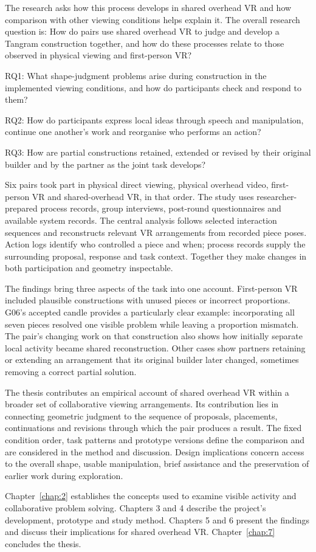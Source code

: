 The research asks how this process develops in shared overhead VR and how comparison with other viewing conditions helps explain it. The overall research question is: How do pairs use shared overhead VR to judge and develop a Tangram construction together, and how do these processes relate to those observed in physical viewing and first-person VR?

RQ1: What shape-judgment problems arise during construction in the implemented viewing conditions, and how do participants check and respond to them?

RQ2: How do participants express local ideas through speech and manipulation, continue one another's work and reorganise who performs an action?

RQ3: How are partial constructions retained, extended or revised by their original builder and by the partner as the joint task develops?

Six pairs took part in physical direct viewing, physical overhead video, first-person VR and shared-overhead VR, in that order. The study uses researcher-prepared process records, group interviews, post-round questionnaires and available system records. The central analysis follows selected interaction sequences and reconstructs relevant VR arrangements from recorded piece poses. Action logs identify who controlled a piece and when; process records supply the surrounding proposal, response and task context. Together they make changes in both participation and geometry inspectable.

The findings bring three aspects of the task into one account. First-person VR included plausible constructions with unused pieces or incorrect proportions. G06's accepted candle provides a particularly clear example: incorporating all seven pieces resolved one visible problem while leaving a proportion mismatch. The pair's changing work on that construction also shows how initially separate local activity became shared reconstruction. Other cases show partners retaining or extending an arrangement that its original builder later changed, sometimes removing a correct partial solution.

The thesis contributes an empirical account of shared overhead VR within a broader set of collaborative viewing arrangements. Its contribution lies in connecting geometric judgment to the sequence of proposals, placements, continuations and revisions through which the pair produces a result. The fixed condition order, task patterns and prototype versions define the comparison and are considered in the method and discussion. Design implications concern access to the overall shape, usable manipulation, brief assistance and the preservation of earlier work during exploration.

Chapter~\ref{chap:2} establishes the concepts used to examine visible activity and collaborative problem solving. Chapters 3 and 4 describe the project's development, prototype and study method. Chapters 5 and 6 present the findings and discuss their implications for shared overhead VR. Chapter~\ref{chap:7} concludes the thesis.

